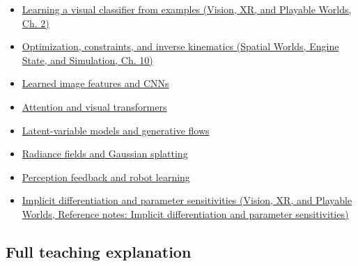 \hypertarget{appendix-40df0855b4a7-used-by}{}

\begin{itemize}
\tightlist
\item
  \href{../07-Vision-XR-and-Playable-Worlds/main.pdf\#nameddest=04-visual-computing-ii-ch031-learning-a-visual-classifier-from-examples}{Learning a visual classifier from examples (Vision, XR, and Playable Worlds, Ch. 2)}
\item
  \href{../05-Spatial-Worlds-Engine-State-and-Simulation/main.pdf\#nameddest=04-visual-computing-ii-ch029-optimization-constraints-and-inverse-kinematics}{Optimization, constraints, and inverse kinematics (Spatial Worlds, Engine State, and Simulation, Ch. 10)}
\item
  \hyperref[appendix-47c51ea026fb]{Learned image features and CNNs}
\item
  \hyperref[appendix-a9d5dfdd164a]{Attention and visual transformers}
\item
  \hyperref[appendix-2c568f05ee34]{Latent-variable models and generative flows}
\item
  \hyperref[appendix-c5b332e400e7]{Radiance fields and Gaussian splatting}
\item
  \hyperref[appendix-b0c42da325f1]{Perception feedback and robot learning}
\item
  \href{../07-Vision-XR-and-Playable-Worlds/main.pdf\#nameddest=appendix-8836553d56fc}{Implicit differentiation and parameter sensitivities (Vision, XR, and Playable Worlds, Reference notes: Implicit differentiation and parameter sensitivities)}
\end{itemize}

\subsection{Full teaching explanation}\label{appendix-40df0855b4a7-full-teaching-explanation}

\hypertarget{appendix-40df0855b4a7-full-teaching-explanation}{}


